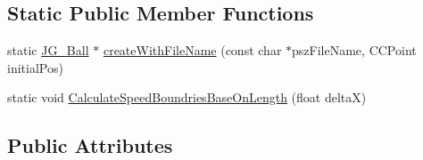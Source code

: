 \subsection*{Static Public Member Functions}
\begin{DoxyCompactItemize}
\item 
static \hyperlink{class_j_g___ball}{J\-G\-\_\-\-Ball} $\ast$ \hyperlink{class_j_g___ball_a12279a500446c9516026d3f52fee87eb}{create\-With\-File\-Name} (const char $\ast$psz\-File\-Name, C\-C\-Point initial\-Pos)
\item 
static void \hyperlink{class_j_g___ball_a8023f3c38c257dd4430a5a01c519a289}{Calculate\-Speed\-Boundries\-Base\-On\-Length} (float delta\-X)
\end{DoxyCompactItemize}
\subsection*{Public Attributes}
